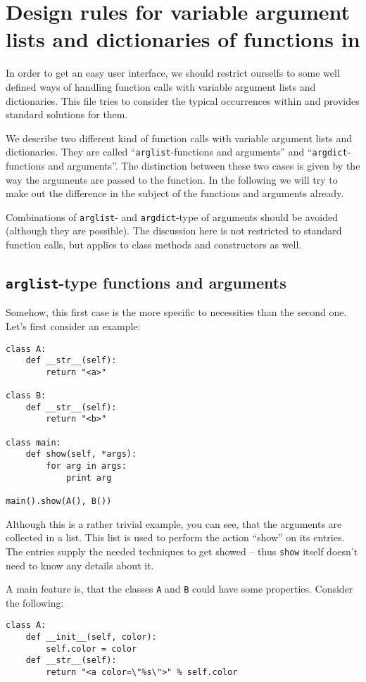 \documentclass{article}
\begin{document}
\section*{Design rules for variable argument lists and dictionaries
of functions in \PyX}

In order to get an easy user interface, we should restrict ourselfs to
some well defined ways of handling function calls with variable
argument lists and dictionaries. This file tries to consider the
typical occurrences within \PyX{} and provides standard solutions for
them.

We describe two different kind of function calls with variable
argument lists and dictionaries. They are called
``\verb|arglist|-functions and arguments'' and
``\verb|argdict|-functions and arguments''. The distinction between
these two cases is given by the way the arguments are passed to the
function. In the following we will try to make out the difference in
the subject of the functions and arguments already.

Combinations of \verb|arglist|- and \verb|argdict|-type of arguments
should be avoided (although they are possible). The discussion here is
not restricted to standard function calls, but applies to class
methods and constructors as well.

\subsection*{\texttt{arglist}-type functions and arguments}

Somehow, this first case is the more specific to \PyX{} necessities than
the second one. Let's first consider an example:
\begin{verbatim}
class A:
    def __str__(self):
        return "<a>"

class B:
    def __str__(self):
        return "<b>"

class main:
    def show(self, *args):
        for arg in args:
            print arg

main().show(A(), B())
\end{verbatim}

Although this is a rather trivial example, you can see, that the
arguments are collected in a list. This list is used to perform the
action ``show'' on its entries. The entries supply the needed
techniques to get showed -- thus \verb|show| itself doesn't need to
know any details about it.

A main feature is, that the classes \verb|A| and \verb|B| could have
some properties. Consider the following:
\begin{verbatim}
class A:
    def __init__(self, color):
        self.color = color
    def __str__(self):
        return "<a color=\"%s\">" % self.color
\end{verbatim}
\end{document}

